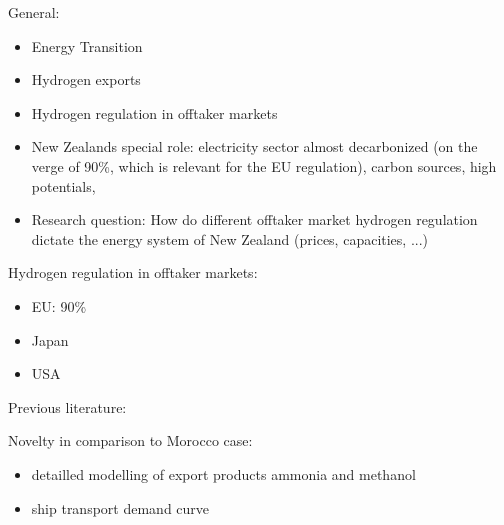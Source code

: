 


General:
\begin{itemize}
    \item Energy Transition
    \item Hydrogen exports
    \item Hydrogen regulation in offtaker markets
    \item New Zealands special role: electricity sector almost decarbonized (on the verge of 90\%, which is relevant for the EU regulation), carbon sources, high potentials, 
    \item Research question: How do different offtaker market hydrogen regulation dictate the energy system of New Zealand (prices, capacities, ...)
\end{itemize}


Hydrogen regulation in offtaker markets:
\begin{itemize}
    \item EU: 90\% 
    \item Japan
    \item USA
\end{itemize}


Previous literature:


Novelty in comparison to Morocco case:
\begin{itemize}
    \item detailled modelling of export products ammonia and methanol
    \item ship transport demand curve
\end{itemize}